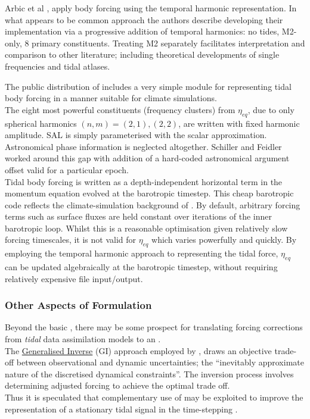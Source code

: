 Arbic et al \citep{Arbic:2010us}, apply body forcing using the temporal harmonic representation.  In what appears to be common approach the authors describe developing their implementation via a progressive addition of temporal harmonics: no tides, M2-only, 8 primary constituents.  Treating M2 separately facilitates interpretation and comparison to other literature; including theoretical developments of single frequencies and tidal atlases.



The public distribution of \MOM{} includes a very simple module for representing tidal body forcing in a manner suitable for climate simulations\cite[pp263] {Griffies:2008vh}.\\
The eight most powerful constituents (frequency clusters) from $\eta_{eq}$, due to only spherical harmonics $(n,m) = (2,1) , (2,2)$, are written with fixed harmonic amplitude.  SAL is simply parameterised with the scalar approximation. \\
Astronomical phase information is neglected altogether.
Schiller and Feidler \citep{Schiller:2007gk} worked around this gap with addition of a hard-coded astronomical argument offset valid for a particular epoch.\\
Tidal body forcing is written as a depth-independent horizontal term in the momentum equation evolved at the barotropic timestep.
This cheap barotropic code reflects the climate-simulation background of \MOM{}.  
By default, arbitrary forcing terms such as surface fluxes are held constant over iterations of the inner barotropic loop.  
Whilst this is a reasonable optimisation given relatively slow forcing timescales, it is not valid for $\eta_{eq}$ which varies powerfully and quickly.
By employing the temporal harmonic approach to representing the tidal force, $\eta_{eq}$ can be updated algebraically at the barotropic timestep, without requiring relatively expensive file input/output.\\




\subsubsection{Other Aspects of Formulation}
Beyond the basic \ATGP{}, there may be some prospect for translating forcing corrections from \emph{tidal} data assimilation models to an \OGCM{}. \\
The \underline{Generalised Inverse} (GI) \cite[pp345] {Zaron:2011ft} approach employed by \OTIS{} \cite{Egbert:2002ug}, draws an objective trade-off between observational and dynamic uncertainties; the ``inevitably approximate nature of the discretised dynamical constraints''\cite[pp155]{Egbert:1996vr}.  The inversion process involves determining adjusted forcing to achieve the optimal trade off.\\
Thus it is speculated that complementary use of \OTIS{} may be exploited to improve the representation of a stationary tidal signal in the time-stepping \OGCM{}.  \\


